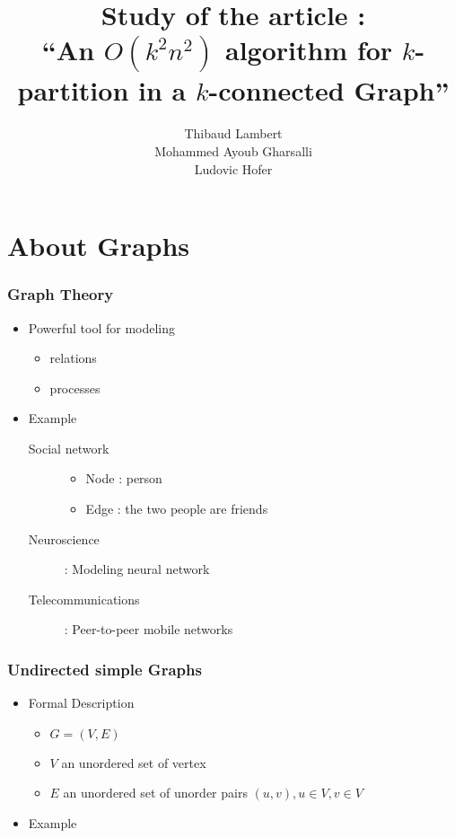 \documentclass[xcolor=dvipsnames]{beamer}
\title[$O(k^2n^2)$ algorithm for $k$-partitionning]{Study of the article :\\``An $O(k^2n^2)$ algorithm for $k$-partition in a $k$-connected Graph''}
\author[Lambert, Gharsalli, Hofer]
       {Thibaud Lambert\\Mohammed Ayoub Gharsalli\\Ludovic Hofer}
\institute{University of Bordeaux I}
\begin{document}
\begin{frame}[plain]
  \maketitle
\end{frame}

\begin{frame}[plain]
  \tableofcontents
\end{frame}

\section{About Graphs}

\begin{frame}
  \frametitle{Graph Theory}
  \begin{itemize}
  \item Powerful tool for modeling
    \begin{itemize}
    \item relations
    \item processes
    \end{itemize}
  \item Example
    \begin{description}
     \item [Social network]
      \begin{itemize}
      \item Node : person
      \item Edge : the two people are friends
      \end{itemize}
     \item [Neuroscience] : Modeling neural network  \cite{BuSp09}
     \item [Telecommunications] : Peer-to-peer mobile networks  \cite{FaCh99}
    \end{description}
  \end{itemize}
\end{frame}

\begin{frame}
  \frametitle{Undirected simple Graphs}
  \begin{itemize}
    \item Formal Description
      \begin{itemize}
      \item $G = (V,E)$
      \item $V$ an unordered set of vertex
      \item $E$ an unordered set of unorder pairs $(u,v), u \in V, v \in V$
      \end{itemize}
    \item Example
  \end{itemize}
\end{frame}
\end{document}
